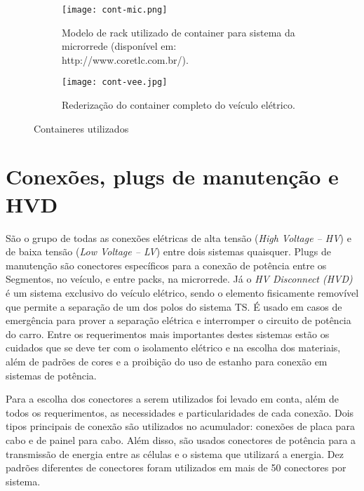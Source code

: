     \begin{figure}[!htb]
        \centering
        \begin{subfigure}{0.48\linewidth}
            \centering
            \texttt{[image: cont-mic.png]}
            \caption{Modelo de rack utilizado de container para sistema da microrrede (disponível em: http://www.coretlc.com.br/).}
            \label{fig:cont-mod-mic}
        \end{subfigure}
        \begin{subfigure}{0.48\linewidth}
            \centering
            \texttt{[image: cont-vee.jpg]}
            \caption{Rederização do container completo do veículo elétrico.}
            \label{fig:cont-mod-vee}
        \end{subfigure}
        \caption{Containeres utilizados}
        \label{fig:conts}
    \end{figure}


\section{Conexões, plugs de manutenção e HVD}

    São o grupo de todas as conexões elétricas de alta tensão (\textit{High Voltage – HV}) e de baixa tensão (\textit{Low Voltage – LV}) entre dois sistemas quaisquer. Plugs de manutenção são conectores específicos para a conexão de potência entre os Segmentos, no veículo, e entre packs, na microrrede. Já o \textit{HV Disconnect (HVD)} é um sistema exclusivo do veículo elétrico, sendo o elemento fisicamente removível que permite a separação de um dos polos do sistema TS. É usado em casos de emergência para prover a separação elétrica e interromper o circuito de potência do carro. Entre os requerimentos mais importantes destes sistemas estão os cuidados que se deve ter com o isolamento elétrico e na escolha dos materiais, além de padrões de cores e a proibição do uso de estanho para conexão em sistemas de potência.

    Para a escolha dos conectores a serem utilizados foi levado em conta, além de todos os requerimentos, as necessidades e particularidades de cada conexão. Dois tipos principais de conexão são utilizados no acumulador: conexões de placa para cabo e de painel para cabo. Além disso, são usados conectores de potência para a transmissão de energia entre as células e o sistema que utilizará a energia. Dez padrões diferentes de conectores foram utilizados em mais de 50 conectores por sistema.

